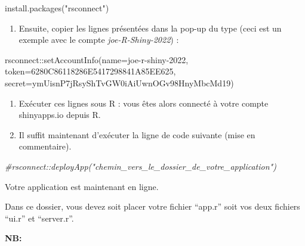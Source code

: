 \documentclass[
]{article}
\newenvironment{Shaded}{\begin{snugshade}}{\end{snugshade}}
\newcommand{\AttributeTok}[1]{\textcolor[rgb]{0.77,0.63,0.00}{#1}}
\newcommand{\CommentTok}[1]{\textcolor[rgb]{0.56,0.35,0.01}{\textit{#1}}}
\newcommand{\FunctionTok}[1]{\textcolor[rgb]{0.00,0.00,0.00}{#1}}
\newcommand{\NormalTok}[1]{#1}
\newcommand{\SpecialCharTok}[1]{\textcolor[rgb]{0.00,0.00,0.00}{#1}}
\newcommand{\StringTok}[1]{\textcolor[rgb]{0.31,0.60,0.02}{#1}}
\providecommand{\tightlist}{%
  \setlength{\itemsep}{0pt}\setlength{\parskip}{0pt}}
\begin{document}
\begin{Shaded}
\begin{Highlighting}[]
\FunctionTok{install.packages}\NormalTok{(}\StringTok{"rsconnect"}\NormalTok{)}
\end{Highlighting}
\end{Shaded}

\begin{enumerate}
\def\labelenumi{\arabic{enumi}.}
\setcounter{enumi}{2}
\tightlist
\item
  Ensuite, copier les lignes présentées dans la pop-up du type (ceci est
  un exemple avec le compte \emph{joe-R-Shiny-2022}) :
\end{enumerate}

\begin{Shaded}
\begin{Highlighting}[]
\NormalTok{rsconnect}\SpecialCharTok{::}\FunctionTok{setAccountInfo}\NormalTok{(}\AttributeTok{name=}\StringTok{\textquotesingle{}joe{-}r{-}shiny{-}2022\textquotesingle{}}\NormalTok{,}
                          \AttributeTok{token=}\StringTok{\textquotesingle{}6280C86118286E5417298841A85EE625\textquotesingle{}}\NormalTok{,}
                          \AttributeTok{secret=}\StringTok{\textquotesingle{}ymUisnP7jRsyShTvGW0iAiUwnOGv98HnyMbcMd19\textquotesingle{}}\NormalTok{)}
\end{Highlighting}
\end{Shaded}

\begin{enumerate}
\def\labelenumi{\arabic{enumi}.}
\setcounter{enumi}{3}
\item
  Exécuter ces lignes sous R : vous êtes alors connecté à votre compte
  shinyapps.io depuis R.
\item
  Il suffit maintenant d'exécuter la ligne de code suivante (mise en
  commentaire).
\end{enumerate}

\begin{Shaded}
\begin{Highlighting}[]
\CommentTok{\#rsconnect::deployApp("chemin\_vers\_le\_dossier\_de\_votre\_application")}
\end{Highlighting}
\end{Shaded}

Votre application est maintenant en ligne.

Dans ce dossier, vous devez soit placer votre fichier ``app.r'' soit vos
deux fichiers ``ui.r'' et ``server.r''.

\textbf{NB:}
\end{document}
